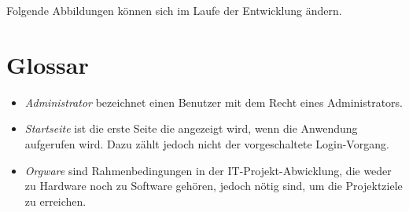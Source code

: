 \documentclass[a4paper,oneside]{scrreprt}
\begin{document}
Folgende Abbildungen können sich im Laufe der Entwicklung ändern.




\chapter{Glossar}

\begin{itemize}
\item \emph{Administrator} bezeichnet einen Benutzer mit dem Recht eines Administrators.

\item \emph{Startseite} ist die erste Seite die angezeigt wird, wenn die Anwendung aufgerufen wird. Dazu zählt jedoch nicht der vorgeschaltete Login-Vorgang.

\item \emph{Orgware} sind Rahmenbedingungen in der IT-Projekt-Abwicklung, die weder zu Hardware noch zu Software gehören, jedoch nötig sind, um die Projektziele zu erreichen.
\end{itemize}
\end{document}

